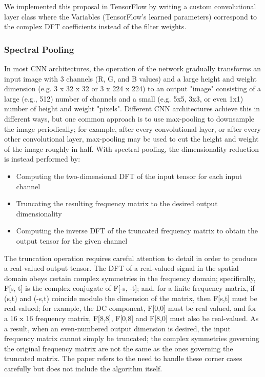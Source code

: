 \documentclass[10pt,journal,compsoc]{IEEEtran}
\begin{document}
We implemented this proposal in TensorFlow by writing a custom convolutional layer class where the Variables (TensorFlow's learned parameters) correspond to the complex DFT coefficients instead of the filter weights. 

\subsubsection{Spectral Pooling}

In most CNN architectures, the operation of the network gradually transforms an input image with 3 channels (R, G, and B values) and a large height and weight dimension (e.g. 3 x 32 x 32 or 3 x 224 x 224) to an output "image" consisting of a large (e.g., 512) number of channels and a small (e.g. 5x5, 3x3, or even 1x1) number of height and weight "pixels". Different CNN architectures achieve this in different ways, but one common approach is to use max-pooling to downsample the image periodically; for example, after every convolutional layer, or after every other convolutional layer, max-pooling may be used to cut the height and weight of the image roughly in half. With spectral pooling, the dimensionality reduction is instead performed by:
\begin{itemize}
\item Computing the two-dimensional DFT of the input tensor for each input channel
\item Truncating the resulting frequency matrix to the desired output dimensionality
\item Computing the inverse DFT of the truncated frequency matrix to obtain the output tensor for the given channel
\end{itemize}

The truncation operation requires careful attention to detail in order to produce a real-valued output tensor. The DFT of a real-valued signal in the spatial domain obeys certain complex symmetries in the frequency domain; specifically, F[s, t] is the complex conjugate of F[-s, -t]; and, for a finite frequency matrix, if (s,t) and (-s,t) coincide modulo the dimension of the matrix, then F[s,t] must be real-valued; for example, the DC component, F[0,0] must be real valued, and for a 16 x 16 frequency matrix, F[8,8], F[0,8] and F[8,0] must also be real-valued. As a result, when an even-numbered output dimension is desired, the input frequency matrix cannot simply be truncated; the complex symmetries governing the original frequency matrix are not the same as the ones governing the truncated matrix. The paper refers to the need to handle these corner cases carefully but does not include the algorithm itself. 
\end{document}
